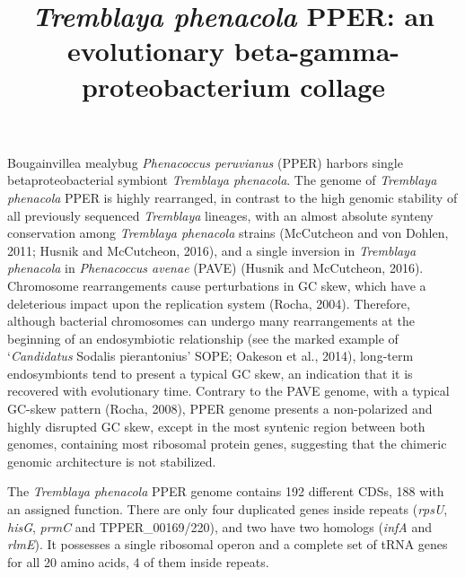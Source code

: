 \documentclass[11pt]{article}
\title{\textit{Tremblaya phenacola} PPER: an evolutionary beta-gamma-proteobacterium collage}
\author{}
\date{}
\begin{document}
\begin{sloppypar}
  \maketitle

  \linenumbers
Bougainvillea mealybug \textit{Phenacoccus peruvianus} (PPER) harbors single betaproteobacterial symbiont \textit{Tremblaya phenacola}. 
The genome of \textit{Tremblaya phenacola} PPER is highly rearranged, in contrast to the high genomic stability of all previously sequenced \textit{Tremblaya} lineages, with an almost absolute synteny conservation among \textit{Tremblaya phenacola} strains (McCutcheon and von Dohlen, 2011; Husnik and McCutcheon, 2016), and a single inversion in \textit{Tremblaya phenacola} in \textit{Phenacoccus avenae} (PAVE) (Husnik and McCutcheon, 2016). 
Chromosome rearrangements cause perturbations in GC skew, which have a deleterious impact upon the replication system (Rocha, 2004). 
Therefore, although bacterial chromosomes can undergo many rearrangements at the beginning of an endosymbiotic relationship (see the marked example of ‘\textit{Candidatus} Sodalis pierantonius’ SOPE; Oakeson et al., 2014), long-term endosymbionts tend to present a typical GC skew, an indication that it is recovered with evolutionary time. 
Contrary to the PAVE genome, with a typical GC-skew pattern (Rocha, 2008), PPER genome presents a non-polarized and highly disrupted GC skew, except in the most syntenic region between both genomes, containing most ribosomal protein genes, suggesting that the chimeric genomic architecture is not stabilized.

\par

The \textit{Tremblaya phenacola} PPER genome contains 192 different CDSs, 188 with an assigned function. 
There are only four duplicated genes inside repeats (\textit{rpsU}, \textit{hisG}, \textit{prmC} and TPPER_00169/220), and two
have two homologs (\textit{infA} and \textit{rlmE}). 
It possesses a single ribosomal operon and a complete set of tRNA genes for all 20 amino acids, 4 of them inside repeats. 

\par


\end{sloppypar}
\end{document}
